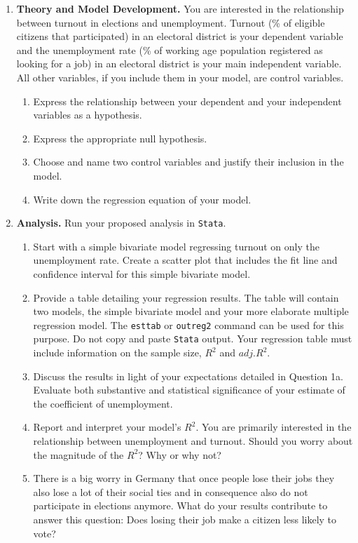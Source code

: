 \documentclass[11pt,a4paper]{article}
\begin{document}
\begin{enumerate}
	\item \textbf{Theory and Model Development.} You are interested in the relationship between turnout in elections and unemployment. Turnout (\% of eligible citizens that participated) in an electoral district is your dependent variable and the unemployment rate (\% of working age population registered as looking for a job) in an electoral district is your main independent variable. All other variables, if you include them in your model, are control variables.
	\begin{enumerate}
		\item Express the relationship between your dependent and your independent variables as a hypothesis.
		\item Express the appropriate null hypothesis.
		\item Choose and name two control variables and justify their inclusion in the model.
		\item Write down the regression equation of your model.
	\end{enumerate}
	\item \textbf{Analysis.} Run your proposed analysis in \texttt{Stata}.
		\begin{enumerate}
			\item Start with a simple bivariate model regressing turnout on only the unemployment rate. Create a scatter plot that includes the fit line and confidence interval for this simple bivariate model.
			\item Provide a table detailing your regression results. The table will contain two models, the simple bivariate model and your more elaborate multiple regression model. The \texttt{esttab} or \texttt{outreg2} command can be used for this purpose. Do not copy and paste \texttt{Stata} output. Your regression table must include information on the sample size, $R^2$ and $adj. R^2$.
			\item Discuss the results in light of your expectations detailed in Question 1a. Evaluate both substantive and statistical	significance of your estimate of the coefficient of unemployment.
			\item Report and interpret your model's $R^2$. You are primarily interested in the relationship between unemployment and turnout. Should you worry about the magnitude of the $R^2$? Why or why not?
			\item There is a big worry in Germany that once people lose their jobs they also lose a lot of their social ties and in consequence also do not participate in elections anymore. What do your results contribute to answer this question: Does losing their job make a citizen less likely to vote?

\end{enumerate}
\end{enumerate}
\end{document}
